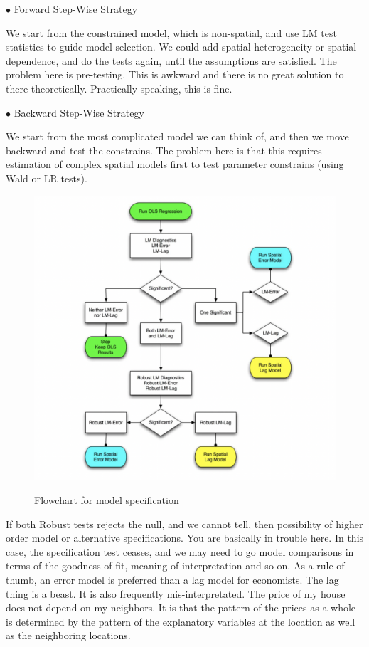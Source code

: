 \documentclass[11pt,a4paper]{amsart}
\theoremstyle{plain}
\theoremstyle{definition}
\begin{document}
$\bullet$ Forward Step-Wise Strategy

We start from the constrained model, which is non-spatial, and use LM test statistics to guide model selection. We could add spatial heterogeneity or spatial dependence, and do the tests again, until the assumptions are satisfied. The problem here is pre-testing. This is awkward and there is no great solution to there theoretically. Practically speaking, this is fine.

$\bullet$ Backward Step-Wise Strategy

We start from the most complicated model we can think of, and then we move backward and test the constrains. The problem here is that this requires estimation of complex spatial models first to test parameter constrains (using Wald or LR tests). 

\begin{figure}[hbt]
{\centering \includegraphics[scale=0.48]{flowchart}}
\caption{Flowchart for model specification}\label{F:flowchart}
\end{figure}

If both Robust tests rejects the null, and we cannot tell, then possibility of higher order model or alternative specifications. You are basically in trouble here. In this case, the specification test ceases, and we may need to go model comparisons in terms of the goodness of fit, meaning of interpretation and so on. As a rule of thumb, an error model is preferred than a lag model for economists. The lag thing is a beast. It is also frequently mis-interpretated. The price of my house does not depend on my neighbors. It is that the pattern of the prices as a whole is determined by the pattern of the explanatory variables at the location as well as the neighboring locations. 
\newpage
\end{document}
